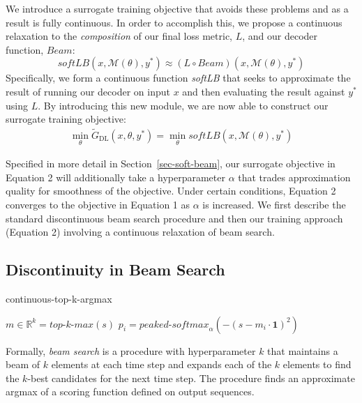 \documentclass[letterpaper]{article} %
\begin{document}
We introduce a surrogate training objective that avoids these problems and as a result is fully continuous. In order to accomplish this, we propose a continuous relaxation to the \emph{composition} of our final loss metric, $L$, and our decoder function, $Beam$:
\[
\textit{softLB}(x, \mathcal{M}(\theta), y^*) \approx (L \circ Beam)(x, \mathcal{M}(\theta), y^*)
\]
Specifically, we form a continuous function \textit{softLB} that seeks to approximate the result of running our decoder on input $x$ and then evaluating the result against $y^*$ using $L$.
By introducing this new module, we are now able to construct our surrogate training objective:
\begin{align}
\min_\theta \tilde{G}_{\textrm{DL}}(x,\theta,y^*) = \min_\theta \textit{softLB}(x, \mathcal{M}(\theta), y^*)
\end{align}

Specified in more detail in Section~\ref{sec-soft-beam}, our surrogate objective in Equation 2 will additionally take a hyperparameter $\alpha$ that trades approximation quality for smoothness of the objective. Under certain conditions, Equation 2 converges to the objective in Equation 1 as $\alpha$ is increased. We first describe the standard discontinuous beam search procedure and then our training approach (Equation 2) involving a continuous relaxation of beam search.

\subsection{Discontinuity in Beam Search}
\begin{algorithm*}[t]
\caption{continuous-top-k-argmax}\label{peak}
\begin{algorithmic}[1]
\State $m \in \mathbb{R}^{k} = \textit{top-k-max}(s)$
 
\State $p_{i} = \textit{peaked-softmax}_{\alpha}(-(s - m_i\cdot{\mathbf{1}})^2)$ 
\EndFor
\end{algorithmic}
\end{algorithm*}
Formally, \textit{beam search} is a procedure with hyperparameter $k$ that maintains a beam of $k$ elements at each time step and expands each of the $k$ elements to find the $k$-best candidates for the next time step. The procedure finds an approximate argmax of a scoring function defined on output sequences.
\end{document}

